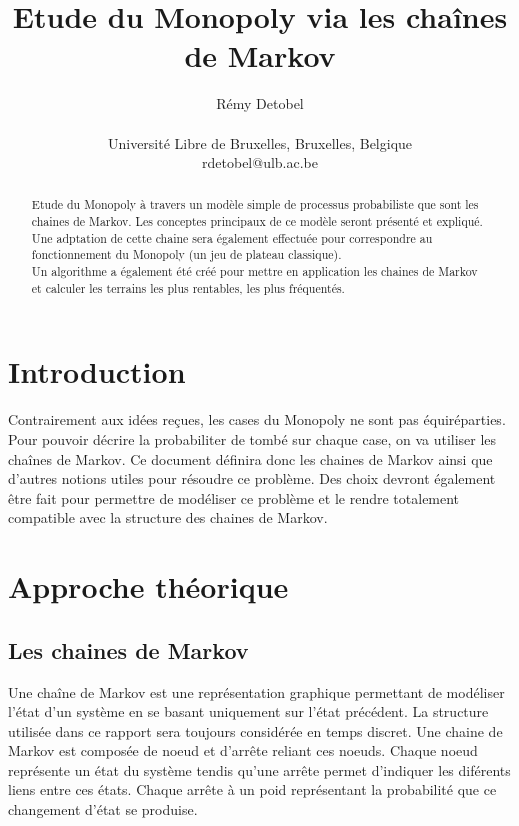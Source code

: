 \documentclass[letterpaper]{article}
\title{Etude du Monopoly via les chaînes de Markov}
\author{Rémy Detobel\\
\mbox{}\\
Université Libre de Bruxelles, Bruxelles, Belgique \\
rdetobel@ulb.ac.be}
\newcommand{\colornode}[1][]{\node[state,
	    align=center,
	    text=gray!40!black,
	    draw=gray,
	    fill=gray!20!white,{#1}]}
\newcommand{\drawedge}{\draw[every loop, line width=0.4mm, fill=gray, draw=gray]}
\begin{document}
\maketitle

\begin{abstract}
  Etude du Monopoly à travers un modèle simple de processus probabiliste 
  que sont les chaines de Markov.  Les conceptes principaux de ce modèle
  seront présenté et expliqué.  Une adptation de cette chaine sera 
  également effectuée pour correspondre au fonctionnement du Monopoly 
  (un jeu de plateau classique).\\
  Un algorithme a également été créé pour mettre en application les chaines
  de Markov et calculer les terrains les plus rentables, les plus fréquentés.
\end{abstract}

\section{Introduction}
  Contrairement aux idées reçues, les cases du Monopoly ne sont pas équiréparties.  Pour
  pouvoir décrire la probabiliter de tombé sur chaque case, on va utiliser les chaînes
  de Markov.  Ce document définira donc les chaines de Markov ainsi que d'autres 
  notions utiles pour résoudre ce problème.  Des choix devront également être fait pour 
  permettre de modéliser ce problème et le rendre totalement compatible avec la structure
  des chaines de Markov.
  
\section{Approche théorique}
  
  \subsection{Les chaines de Markov}
    Une chaîne de Markov est une représentation graphique permettant 
    de modéliser l'état d'un système en se basant uniquement sur l'état précédent. La
    structure utilisée dans ce rapport sera toujours considérée en temps discret.
    Une chaine de Markov est composée de noeud et d'arrête reliant ces noeuds.  Chaque
    noeud représente un état du système tendis qu'une arrête permet d'indiquer les 
    diférents liens entre ces états.  Chaque arrête à un poid représentant la probabilité 
    que ce changement d'état se produise.\\
    \begin{center}
    \end{center}
    
\end{document}
